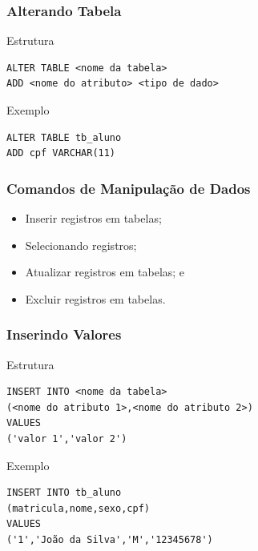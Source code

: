 \documentclass{beamer}
\begin{document}
\begin{frame}[fragile]
\frametitle{Alterando Tabela}

\begin{block}{Estrutura}
\begin{lstlisting}
ALTER TABLE <nome da tabela> 
ADD <nome do atributo> <tipo de dado>
\end{lstlisting}
\end{block}\vfill

\begin{exampleblock}{Exemplo}
\begin{lstlisting}
ALTER TABLE tb_aluno
ADD cpf VARCHAR(11)
\end{lstlisting}
\end{exampleblock}
\end{frame}

\begin{frame}
\frametitle{Comandos de Manipulação de Dados}

\begin{itemize}
	\item Inserir registros em tabelas;
	\item Selecionando registros;
	\item Atualizar registros em tabelas; e
	\item Excluir registros em tabelas.
\end{itemize}
\end{frame}

\begin{frame}[fragile]
\frametitle{Inserindo Valores}

\begin{block}{Estrutura}
\begin{lstlisting}
INSERT INTO <nome da tabela>
(<nome do atributo 1>,<nome do atributo 2>)
VALUES
('valor 1','valor 2')
\end{lstlisting}
\end{block}\vfill

\begin{exampleblock}{Exemplo}
\begin{lstlisting}
INSERT INTO tb_aluno
(matricula,nome,sexo,cpf)
VALUES
('1','João da Silva','M','12345678')
\end{lstlisting}
\end{exampleblock}
\end{frame}
\end{document}
